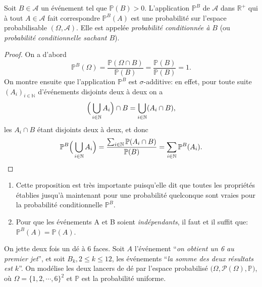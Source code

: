 \sld{\vfill\pagebreak[5]}%

\begin{proposition}
	Soit $B \in \mathcal{A}$ un événement tel que $\mathbb{P} (B) >0$. L'application $\mathbb{P}^B$ de $\mathcal{A}$ dans $\mathbb{R}^+$ qui à tout $A \in \mathcal{A}$ fait correspondre $\mathbb{P}^B(A)$ est une probabilité sur l'espace probabilisable $(\Omega,\mathcal{A})$. Elle est appelée \emph{probabilité conditionnée à $B$} (ou \emph{probabilité conditionnelle sachant $B$}).
\end{proposition}

\begin{proof}
	 On a d'abord
	 \[ \mathbb{P}^B(\Omega) = \frac{\mathbb{P} (\Omega \cap B)}{\mathbb{P} (B)} = \frac{\mathbb{P} (B)}{\mathbb{P} (B)} =1 .\]
On montre ensuite que l'application $\mathbb{P}^B$ est $\sigma$-additive: en effet, pour toute suite $(A_i)_{i \in \mathbb{N}}$ d'événements disjoints deux à deux on a
\[ 
\redspace
\Big( \bigcup_{i \in \mathbb{N}} A_i \Big) \cap B =  \bigcup_{i \in \mathbb{N}} (A_i \cap B), \]
les $A_i \cap B$ étant disjoints deux à deux, et donc 
\[ 
\redspace
\mathbb{P}^B \Big( \bigcup_{i \in \mathbb{N}} A_i \Big) = \frac{ \sum_{i \in \mathbb{N}} \mathbb{P} (A_i \cap B)}{\mathbb{P} (B)} = \sum_{i \in \mathbb{N}} \mathbb{P}^B (A_i) .\]\qedhere
\end{proof}

\begin{remark}
	\begin{enumerate}
		\item Cette proposition est très importante puisqu'elle dit que toutes les propriétés établies jusqu'à maintenant pour une probabilité quelconque sont vraies pour la probabilité conditionnelle $\mathbb{P}^B$.
		\item Pour que les événements A et B soient \emph{indépendants}, il faut et il suffit que: $\mathbb{P}^B (A) = \mathbb{P} (A)$.
	\end{enumerate}
\end{remark}

\begin{exemple}
On jette deux fois un dé à 6 faces. Soit $A$ l'événement ``\textit{on obtient un 6 au premier jet}'', et soit $B_k, 2 \leq k \leq 12$, les événements ``\textit{la somme des deux résultats est $k$}''. On modélise les deux lancers de dé par l'espace probabilisé $\big( \Omega,\mathcal{P} (\Omega), \mathbb{P} \big)$, où $\Omega=\{1,2,\cdots,6\}^2$ et $\mathbb{P}$ est la probabilité uniforme.  \pl{\rep{4cm}}
\end{exemple}


